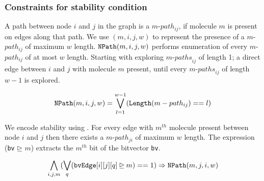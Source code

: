 \subsubsection{Constraints for stability condition}
%
A path between node $i$ and $j$ in the graph is a $m$-$path_{ij}$, if molecule $m$ is present on edges along that path.
%
%
We use {\npath}$(m, i, j, w)$ to represent the presence of a $m$-$path_{ij}$ of maximum $w$ length.
%
%
$\texttt{NPath}(m, i, j, w)$ performs enumeration of every $m$-$path_{ij}$ of at most $w$ length. 
%
Starting with exploring $m$-${paths}_{ij}$ of length 1; a direct edge between $i$ and $j$ with molecule $m$ present, until every $m$-${paths}_{ij}$ of length $w-1$ is explored.


\begin{align*}
\texttt{NPath}(m, i, j, w) = \bigvee\limits_{l = 1}^{w-1} (\texttt{Length} (m-path_{ij}) == l)
\end{align*}

We encode stability using \npath. For every edge with $m^{th}$ molecule present between node $i$ and $j$ then there exists a $m$-$path_{ji}$ of maximum $w$ length.
%
The expression (\texttt{bv} $\unrhd$ $m$) extracts the $m^{th}$ bit of the bitvector \texttt{bv}. 

\begin{align*}
	\bigwedge\limits_{i,j,m} (\bigvee_{q} (\texttt{bvEdge}[i][j][q] \unrhd m) == 1) \Rightarrow \texttt{NPath}(m, j, i, w)
\end{align*}

